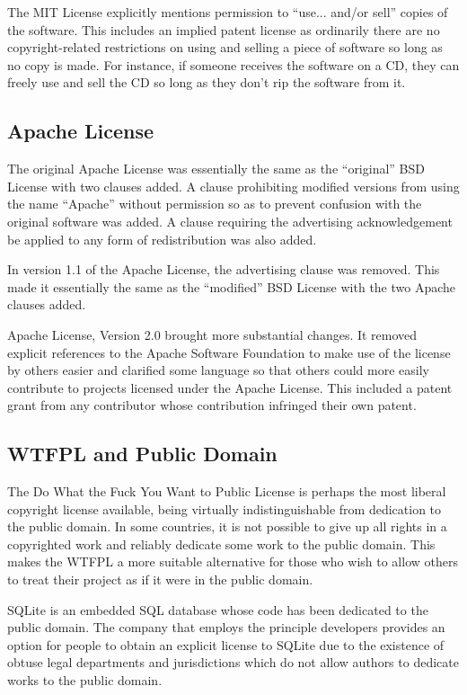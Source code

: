 \documentclass[12pt,letterpaper]{article}
\begin{document}
The MIT License explicitly mentions permission to ``use... and/or sell'' copies of the software. This includes an implied patent license as ordinarily there are no copyright-related restrictions on using and selling a piece of software so long as no copy is made.\cite{boost} For instance, if someone receives the software on a CD, they can freely use and sell the CD so long as they don't rip the software from it.\cite{copyright}

\subsection{Apache License}

The original Apache License was essentially the same as the ``original'' BSD License with two clauses added. A clause prohibiting modified versions from using the name ``Apache'' without permission so as to prevent confusion with the original software was added. A clause requiring the advertising acknowledgement be applied to any form of redistribution was also added.\cite{apache1}

In version 1.1 of the Apache License, the advertising clause was removed. This made it essentially the same as the ``modified'' BSD License with the two Apache clauses added.\cite{apache11}

Apache License, Version 2.0 brought more substantial changes. It removed explicit references to the Apache Software Foundation to make use of the license by others easier and clarified some language so that others could more easily contribute to projects licensed under the Apache License. This included a patent grant from any contributor whose contribution infringed their own patent.\cite{apache2}

\subsection{WTFPL and Public Domain}

The Do What the Fuck You Want to Public License is perhaps the most liberal copyright license available, being virtually indistinguishable from dedication to the public domain. In some countries, it is not possible to give up all rights in a copyrighted work and reliably dedicate some work to the public domain. This makes the WTFPL a more suitable alternative for those who wish to allow others to treat their project as if it were in the public domain.\cite{wtfpl}

SQLite is an embedded SQL database whose code has been dedicated to the public domain. The company that employs the principle developers provides an option for people to obtain an explicit license to SQLite due to the existence of obtuse legal departments and jurisdictions which do not allow authors to dedicate works to the public domain.\cite{sqlite}
\end{document}
